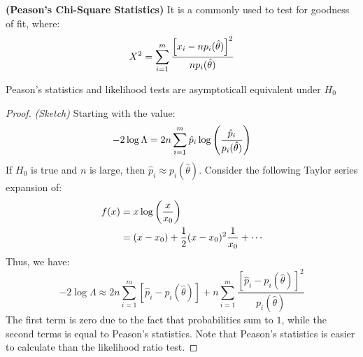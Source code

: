 \begin{definition}{\textbf{(Peason's Chi-Square Statistics)}}
    It is a commonly used to test for goodness of fit, where:
    \begin{equation*}
        X^2 = \sum^m_{i=1}\frac{\left[ x_i - np_i(\hat{\theta}) \right]^2}{np_i(\hat{\theta})}
    \end{equation*}
\end{definition}

\begin{proposition}
    Peason's statistics and likelihood tests are asymptoticall equivalent under $H_0$
\end{proposition}
\begin{proof}{\emph{(Sketch)}}
    Starting with the value:
    \begin{equation*}
        -2\log\Lambda = 2n\sum^m_{i=1}\hat{p}_i\log\left( \frac{\hat{p}_i}{p_i(\hat{\theta})} \right)
    \end{equation*}
    If $H_0$ is true and $n$ is large, then $\hat{p}_i\approx p_i(\hat{\theta})$. Consider the following Taylor series expansion of:
    \begin{equation*}
    \begin{aligned}
        f(x) &= x\log\left( \frac{x}{x_0} \right) \\
        &= (x-x_0) + \frac{1}{2}(x-x_0)^2\frac{1}{x_0} + \cdots 
    \end{aligned}
    \end{equation*}
    Thus, we have:
    \begin{equation*}
        -2\log\Lambda \approx 2n\sum^m_{i=1}[\hat{p}_i - p_i(\hat{\theta})] + n\sum^m_{i=1}\frac{[\hat{p}_i - p_i(\hat{\theta})]^2}{p_i(\hat{\theta})}
    \end{equation*}
    The first term is zero due to the fact that probabilities sum to $1$, while the second terms is equal to Peason's statistics. Note that Peason's statistics is easier to calculate than the likelihood ratio test.
\end{proof}

